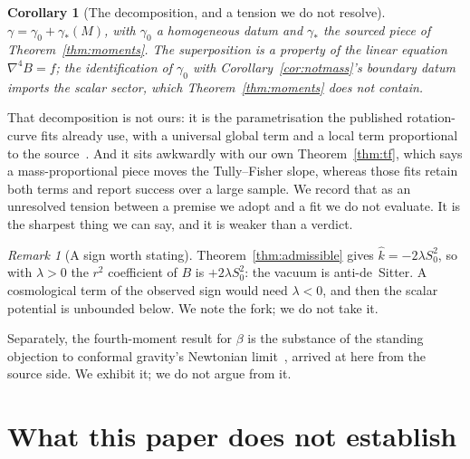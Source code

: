 \documentclass[11pt]{article}
\newtheorem{corollary}[theorem]{Corollary}
\theoremstyle{definition}
\theoremstyle{remark}
\newtheorem{remark}[theorem]{Remark}
\begin{document}
\begin{corollary}[The decomposition, and a tension we do not resolve]
\label{cor:inequality}
\(\gamma=\gamma_{0}+\gamma_{*}(M)\), with \(\gamma_{0}\) a homogeneous datum
and \(\gamma_{*}\) the sourced piece of Theorem~\ref{thm:moments}.  The
superposition is a property of the linear equation \(\nabla^{4}B=f\); the
identification of \(\gamma_{0}\) with Corollary~\ref{cor:notmass}'s boundary
datum imports the scalar sector, which Theorem~\ref{thm:moments} does not
contain.
\end{corollary}

That decomposition is not ours: it is the parametrisation the published
rotation-curve fits already use, with a universal global term and a local term
proportional to the source~\cite{MannheimOBrien2012}.  And it sits awkwardly
with our own Theorem~\ref{thm:tf}, which says a mass-proportional piece moves
the Tully--Fisher slope, whereas those fits retain both terms and report
success over a large sample.  We record that as an unresolved tension between
a premise we adopt and a fit we do not evaluate.  It is the sharpest thing we
can say, and it is weaker than a verdict.

\begin{remark}[A sign worth stating]
\label{rem:sign}
Theorem~\ref{thm:admissible} gives \(\hat k=-2\lambda S_{0}^{2}\), so with
\(\lambda>0\) the \(r^{2}\) coefficient of \(B\) is \(+2\lambda S_{0}^{2}\):
the vacuum is anti-de~Sitter.  A cosmological term of the observed sign would
need \(\lambda<0\), and then the scalar potential is unbounded below.  We
note the fork; we do not take it.
\end{remark}

Separately, the fourth-moment result for \(\beta\) is the substance of the
standing objection to conformal gravity's Newtonian
limit~\cite{Flanagan2006,MK1994}, arrived at here from the source side.  We
exhibit it; we do not argue from it.

\section{What this paper does not establish}
\label{sec:notestablished}
\end{document}
